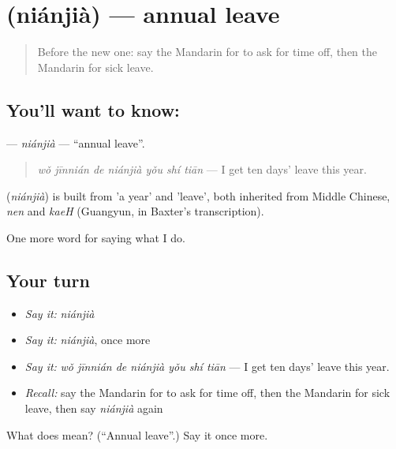 \section[\texorpdfstring{\zh{年假} (niánjià)}{年假 (niánjià)}]{ (niánjià) — annual leave}

\label{lesson:ZH-C263-nianjia}



\begin{quote}
Before the new one: say the Mandarin for to ask for time off, then the Mandarin for sick leave.
\end{quote}

\subsection*{You'll want to know: }
\textbf{} — \emph{niánjià} — \textquotedblleft{}annual leave\textquotedblright{}.

\begin{quote}
\textbf{} \emph{wǒ jīnnián de niánjià yǒu shí tiān} — I get ten days' leave this year.
\end{quote}

\begin{cousinweb}
\textbf{} (\emph{niánjià}) is built from  'a year' and  'leave', both inherited from Middle Chinese, \emph{nen} and \emph{kaeH} (Guangyun, in Baxter's transcription).
\end{cousinweb}

\begin{grammarlens}[title={What you've built}]
One more word for saying what I do.
\end{grammarlens}

\subsection*{Your turn}
\begin{itemize}
\raggedright
  \item \emph{Say it:} \emph{niánjià}
  \item \emph{Say it:} \emph{niánjià}, once more
  \item \emph{Say it:} \emph{wǒ jīnnián de niánjià yǒu shí tiān} — I get ten days' leave this year.
  \item \emph{Recall:} say the Mandarin for to ask for time off, then the Mandarin for sick leave, then say \emph{niánjià} again
\end{itemize}

\begin{tcolorbox}[breakable,colback=teal!4,colframe=teal!35!black,title={Before you move on}]
What does  mean? (\textquotedblleft{}Annual leave\textquotedblright{}.) Say it once more.
\end{tcolorbox}
